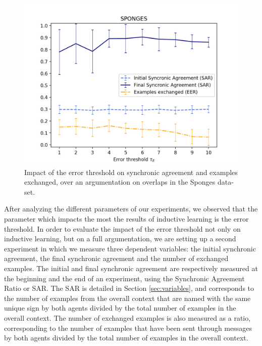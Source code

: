 \begin{figure}[t]
    \centering
    \includegraphics[width = \textwidth]{figs/threshold_SPON.png}
    \caption{Impact of the error threshold on synchronic agreement and examples exchanged, over an argumentation on overlaps in the Sponges data-set.}
    \label{fig:threshold_spon}
\end{figure}

After analyzing the different parameters of our experiments, we observed that the parameter which impacts the most the results of inductive learning is the error threshold. In order to evaluate the impact of the error threshold not only on inductive learning, but on a full argumentation, we are setting up a second experiment in which we measure three dependent variables: the initial synchronic agreement, the final synchronic agreement and the number of exchanged examples. The initial and final synchronic agreement are respectively measured at the beginning and the end of an experiment, using the Synchronic Agreement Ratio or SAR. The SAR is detailed in Section \ref{sec:variables}, and corresponds to the number of examples from the overall context that are named with the same unique sign by both agents divided by the total number of examples in the overall context. The number of exchanged examples is also measured as a ratio, corresponding to the number of examples that have been sent through messages by both agents divided by the total number of examples in the overall context.

